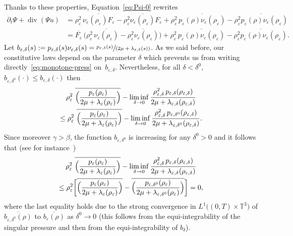 \documentclass[10pt]{amsart}
\newcommand{\<}{\bigl\langle}
\renewcommand{\>}{\bigr\rangle}
\newcommand{\spfrac}[2]{\sfrac{#1}{(#2)}}
\newcommand{\labeleq}[1]{}
\theoremstyle{definition}
\theoremstyle{remark}
\newcommand{\TT}{\mathbb{T}^3}
\DeclareMathOperator{\Div}{div}
\let\ov\overline
\let\ep\varepsilon
\begin{document}
Thanks to these properties, Equation~\eqref{eq:Psi-0} rewrites
\begin{align*}\labeleq{Psi}
\partial_t \Psi + \Div(\Psi u)
& = \rho_\ep^2\, \ov{\nu_\ep (\rho_\ep) F_\ep } - \ov{\rho_\ep^2 \nu_\ep (\rho_\ep) F_\ep } + \rho_\ep^2\, \ov{ p_\ep(\rho) \nu_\ep(\rho_\ep) } - \ov{ \rho_\ep^2 p_\ep(\rho) \nu_\ep(\rho_\ep) } \\
& = \ov{ F_\ep } \, \bigl(\rho_\ep^2 \,\ov{\nu_\ep(\rho_\ep)} - \ov{\rho_\ep^2 \nu_\ep(\rho_\ep)} \bigr) + \rho_\ep^2\, \ov{ p_\ep(\rho) \nu_\ep(\rho_\ep) } - \ov{ \rho_\ep^2 p_\ep(\rho) \nu_\ep(\rho_\ep) }.
\end{align*}
Let $b_{\ep,\delta}(s) := p_{\ep,\delta}(s) \nu_{\ep,\delta}(s) = \spfrac{p_{\ep,\delta}(s)}{2\mu +\lambda_{\ep,\delta}(s)}$.
As we said before, our constitutive laws depend on the parameter $\delta$ which prevents us from writing directly~\eqref{eq:monotone-press} on~$b_{\ep,\delta}$.
Nevertheless, for all $\delta < \delta^0$, $b_{\ep,\delta^0}(\cdot) \leq b_{\ep,\delta}(\cdot)$ then
\begin{multline*}
\rho_\ep^2 \ \ov{\Bigl(\dfrac{p_\ep(\rho_\ep)}{2\mu +\lambda_\ep(\rho_\ep)} \Bigr)} - \liminf_{\delta \rightarrow 0} \dfrac{\rho_{\ep,\delta}^2\, p_{\ep,\delta}(\rho_{\ep,\delta})}{2\mu +\lambda_{\ep,\delta}(\rho_{\ep,\delta})}\\
\leq \rho_\ep^2 \ \ov{\Bigl(\dfrac{p_\ep(\rho_\ep)}{2\mu +\lambda_\ep(\rho_\ep)} \Bigr)} - \liminf_{\delta \rightarrow 0} \dfrac{\rho_{\ep,\delta}^2\, p_{\ep,\delta^0}(\rho_{\ep,\delta})}{2\mu +\lambda_{\ep,\delta^0}(\rho_{\ep,\delta})}.
\end{multline*}
Since moreover $\gamma > \beta$, the function $b_{\ep,\delta^0}$ is increasing for any $\delta^0 > 0$ and it follows that (see for instance~\cite[Lem.\,3.35]{novotny2004})
\begin{multline*}
\rho_\ep^2 \ \ov{\Bigl(\dfrac{p_\ep(\rho_\ep)}{2\mu +\lambda_\ep(\rho_\ep)} \Bigr)} - \liminf_{\delta \rightarrow 0} \dfrac{\rho_{\ep,\delta}^2\, p_{\ep,\delta}(\rho_{\ep,\delta})}{2\mu +\lambda_{\ep,\delta}(\rho_{\ep,\delta})}\\
\leq \rho_\ep^2 \biggl[ \ov{\Bigl(\dfrac{p_\ep(\rho_\ep)}{2\mu +\lambda_\ep(\rho_\ep)} \Bigr)} - \ov{\Bigl(\dfrac{ p_{\ep,\delta^0}(\rho_{\ep})}{2\mu +\lambda_{\ep,\delta^0}(\rho_{\ep})}\Bigr)}\biggr] = 0,
\end{multline*}
where the last equality holds due to the strong convergence in $L^1\big((0,T)\times \TT\big)$ of $\ov{b_{\ep,\delta^0}(\rho)}$ to $\ov{b_{\ep}(\rho)}$ as $\delta^0 \rightarrow 0$ (this follows from the equi-integrability of the singular pressure and then from the equi-integrability of $b_\delta$).
\end{document}
